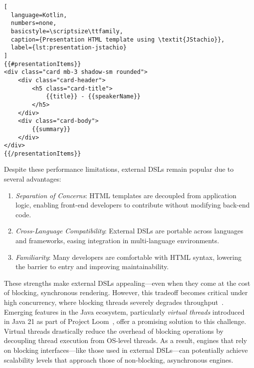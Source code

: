 \begin{center}
\begin{minipage}{0.70\textwidth}
\begin{lstlisting}[
  language=Kotlin,
  numbers=none,
  basicstyle=\scriptsize\ttfamily,
  caption={Presentation HTML template using \textit{JStachio}},
  label={lst:presentation-jstachio}
]
{{#presentationItems}}
<div class="card mb-3 shadow-sm rounded">
    <div class="card-header">
        <h5 class="card-title">
            {{title}} - {{speakerName}}
        </h5>
    </div>
    <div class="card-body">
        {{summary}}
    </div>
</div>
{{/presentationItems}}
\end{lstlisting}
\end{minipage}
\end{center}

Despite these performance limitations, external DSLs remain popular due to
several advantages:

\begin{enumerate}
    \item \emph{Separation of Concerns}: HTML templates are decoupled from application logic, enabling front-end developers to contribute without modifying back-end code.
    \item \emph{Cross-Language Compatibility}: External DSLs are portable across languages and frameworks, easing integration in multi-language environments.
    \item \emph{Familiarity}: Many developers are comfortable with HTML syntax, lowering the barrier to entry and improving maintainability.
\end{enumerate}

These strengths make external DSLs appealing—even when they come at the cost of
blocking, synchronous rendering. However, this tradeoff becomes critical under
high concurrency, where blocking threads severely degrades throughput~\cite{PSSR-WISE2024}.
Emerging features in the Java ecosystem, particularly \textit{virtual threads}
introduced in Java 21 as part of Project Loom~\cite{Veen2024}, offer a promising solution to
this challenge. Virtual threads drastically reduce the overhead of blocking
operations by decoupling thread execution from OS-level threads. As a result,
engines that rely on blocking interfaces—like those used in
external DSLs—can potentially achieve scalability levels that approach those of
non-blocking, asynchronous engines.


